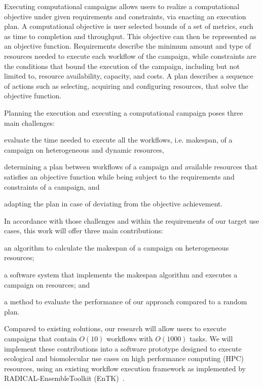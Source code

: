 Executing computational campaigns allows users to realize a computational objective under given requirements and constraints, via enacting an execution plan. A computational objective is user selected bounds of a set of metrics, such as time to completion and throughput. This objective can then be represented as an objective function. Requirements describe the minimum amount and type of resources needed to execute each workflow of the campaign, while constraints are the conditions that bound the execution of the campaign, including but not limited  to, resource availability, capacity, and costs. A plan describes a sequence of actions such as selecting, acquiring and configuring resources, that solve the objective function.


Planning the execution and executing a computational campaign poses three main challenges: 
\begin{inparaenum}[(i)]
\item evaluate the time needed to execute all the workflows, i.e. makespan, of a campaign on heterogeneous and dynamic resources,
\item determining a plan between workflows of a campaign and available resources that satisfies an objective function while being subject to the requirements and constraints of a campaign, and
\item adapting the plan in case of deviating from the objective achievement.
\end{inparaenum}

In accordance with those challenges and within the requirements of our target use cases, this work will offer three main contributions: 
\begin{inparaenum}[(1)]
\item an algorithm to calculate the makespan of a campaign on heterogeneous resources;
\item a software system that implements the makespan algorithm and executes a campaign on resources; and 
\item a method to evaluate the performance of our approach compared to a random plan. 
\end{inparaenum}
Compared to existing solutions, our research will allow users to execute campaigns that contain $O(10)$ workflows with $O(1000)$ tasks. We will implement these contributions into a software prototype designed to execute ecological and biomolecular use cases on high performance computing (HPC) resources, using an existing workflow execution framework as implemented by RADICAL-EnsembleToolkit (EnTK)~\cite{balasubramanian2018harnessing}.


